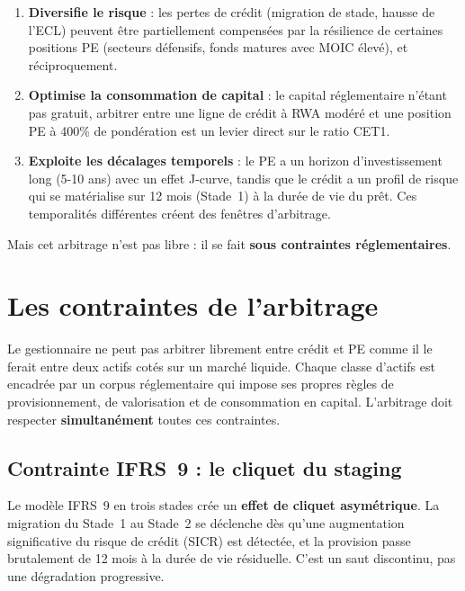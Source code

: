 \documentclass[12pt,a4paper]{article}
\begin{document}
\begin{enumerate}
  \item \textbf{Diversifie le risque} : les pertes de crédit (migration de stade, hausse de l'ECL) peuvent être partiellement compensées par la résilience de certaines positions PE (secteurs défensifs, fonds matures avec MOIC élevé), et réciproquement.
  \item \textbf{Optimise la consommation de capital} : le capital réglementaire n'étant pas gratuit, arbitrer entre une ligne de crédit à RWA modéré et une position PE à 400\% de pondération est un levier direct sur le ratio CET1.
  \item \textbf{Exploite les décalages temporels} : le PE a un horizon d'investissement long (5-10 ans) avec un effet J-curve, tandis que le crédit a un profil de risque qui se matérialise sur 12 mois (Stade~1) à la durée de vie du prêt. Ces temporalités différentes créent des fenêtres d'arbitrage.
\end{enumerate}

Mais cet arbitrage n'est pas libre : il se fait \textbf{sous contraintes réglementaires}.

\section{Les contraintes de l'arbitrage}

\begin{tension}
Le gestionnaire ne peut pas arbitrer librement entre crédit et PE comme il le ferait entre deux actifs cotés sur un marché liquide. Chaque classe d'actifs est encadrée par un corpus réglementaire qui impose ses propres règles de provisionnement, de valorisation et de consommation en capital. L'arbitrage doit respecter \textbf{simultanément} toutes ces contraintes.
\end{tension}

\subsection{Contrainte IFRS~9 : le cliquet du staging}

Le modèle IFRS~9 en trois stades crée un \textbf{effet de cliquet asymétrique}. La migration du Stade~1 au Stade~2 se déclenche dès qu'une augmentation significative du risque de crédit (SICR) est détectée, et la provision passe brutalement de 12 mois à la durée de vie résiduelle. C'est un saut discontinu, pas une dégradation progressive.
\end{document}

